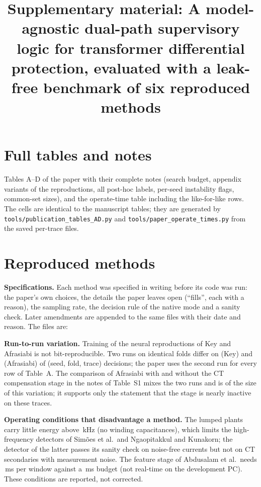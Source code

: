 \documentclass[11pt]{article}
\title{Supplementary material: A model-agnostic dual-path supervisory logic for transformer differential protection, evaluated with a leak-free benchmark of six reproduced methods}
\date{}
\begin{document}
\maketitle

\section{Full tables and notes}
\label{sec:S1}
Tables A--D of the paper with their complete notes (search budget, appendix variants of the reproductions, all post-hoc labels, per-seed instability flags, common-set sizes), and the operate-time table including the like-for-like rows. The cells are identical to the manuscript tables; they are generated by \texttt{tools/publication\_tables\_AD.py} and \texttt{tools/paper\_operate\_times.py} from the saved per-trace files.





\clearpage

\section{Reproduced methods}
\label{sec:S2}
\textbf{Specifications.} Each method was specified in writing before its code was run: the paper's own choices, the details the paper leaves open (``fills'', each with a reason), the sampling rate, the decision rule of the native mode and a sanity check. Later amendments are appended to the same files with their date and reason. The files are:

\textbf{Run-to-run variation.} Training of the neural reproductions of Key and Afrasiabi is not bit-reproducible. Two runs on identical folds differ on \runDiffKey{} (Key) and \runDiffAfr{} (Afrasiabi) of \runKeysKey{} (seed, fold, trace) decisions; the paper uses the second run for every row of Table~A. The comparison of Afrasiabi with and without the CT compensation stage in the notes of Table~S1 mixes the two runs and is of the size of this variation; it supports only the statement that the stage is nearly inactive on these traces.

\textbf{Operating conditions that disadvantage a method.} The lumped plants carry little energy above \hfLimit\,kHz (no winding capacitances), which limits the high-frequency detectors of Sim\~oes et al.\ and Ngaopitakkul and Kunakorn; the detector of the latter passes its sanity check on noise-free currents but not on CT secondaries with measurement noise. The feature stage of Abdusalam et al.\ needs \latAbd\,ms per window against a \latAbdBudget\,ms budget (not real-time on the development PC). These conditions are reported, not corrected.
\end{document}
